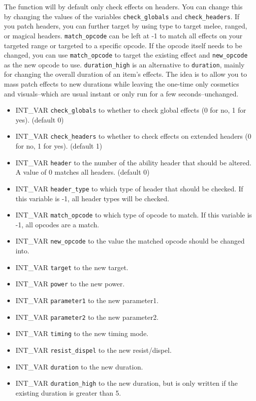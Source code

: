 \documentclass{article}
\begin{document}
The function will by default only check effects on headers. You can change this by changing the values of the variables \verb+check_globals+ and \verb+check_headers+. If you patch headers, you can further target by using type to target melee, ranged, or magical headers. \verb+match_opcode+ can be left at -1 to match all effects on your targeted range or targeted to a specific opcode. If the opcode itself needs to be changed, you can use \verb+match_opcode+ to target the existing effect and \verb+new_opcode+ as the new opcode to use. \verb+duration_high+ is an alternative to \verb+duration+, mainly for changing the overall duration of an item's effects. The idea is to allow you to mass patch effects to new durations while leaving the one-time only cosmetics and visuals--which are usual instant or only run for a few seconds--unchanged.
\begin{itemize}
\item INT_VAR \verb+check_globals+ to whether to check global effects (0 for no, 1 for yes). (default 0)
\item INT_VAR \verb+check_headers+ to whether to check effects on extended headers (0 for no, 1 for yes). (default 1)
\item INT_VAR \verb+header+ to the number of the ability header that should be altered. A value of 0 matches all headers. (default 0)
\item INT_VAR \verb+header_type+ to which type of header that should be checked. If this variable is -1, all header types will be checked.
\item INT_VAR \verb+match_opcode+ to which type of opcode to match. If this variable is -1, all opcodes are a match.
\item INT_VAR \verb+new_opcode+ to the value the matched opcode should be changed into.
\item INT_VAR \verb+target+ to the new target.
\item INT_VAR \verb+power+ to the new power.
\item INT_VAR \verb+parameter1+ to the new parameter1.
\item INT_VAR \verb+parameter2+ to the new parameter2.
\item INT_VAR \verb+timing+ to the new timing mode.
\item INT_VAR \verb+resist_dispel+ to the new resist/dispel.
\item INT_VAR \verb+duration+ to the new duration.
\item INT_VAR \verb+duration_high+ to the new duration, but is only written if the existing duration is greater than 5.

\end{itemize}
\end{document}
